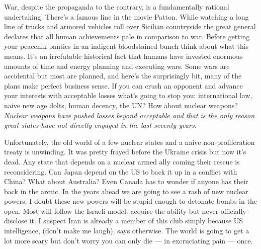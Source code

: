 War, despite the propaganda to the contrary, is a fundamentally rational
undertaking. There's a famous line in the movie Patton. While watching a
long line of trucks and armored vehicles roll over Sicilian countryside
the great general declares that all human achievements pale in
comparison to war. Before getting your peacenik panties in an indigent
bloodstained bunch think about what this means. It's an irrefutable
historical fact that humans have invested enormous amounts of time and
energy planning and executing wars. Some wars are accidental but most
are planned, and here's the surprisingly bit, many of the plans make
perfect business sense. If you can crush an opponent and advance your
interests with acceptable losses what's going to stop you:
international law, naive new age dolts, human decency, the UN? How
about nuclear weapons? \emph{Nuclear weapons have pushed losses beyond
acceptable and that is the only reason great states have not directly
engaged in the last seventy years.}

Unfortunately, the old world of a few nuclear states and a naive
non-proliferation treaty is unwinding. It was pretty frayed before the
Ukraine crisis but now it's dead. Any state that depends on a nuclear
armed ally coming their rescue is reconsidering. Can Japan depend on the
US to back it up in a conflict with China? What about Australia? Even
Canada has to wonder if anyone has their back in the arctic. In the
years ahead we are going to see a rash of new nuclear powers. I doubt
these new powers will be stupid enough to detonate bombs in the open.
Most will follow the Israeli model: acquire the ability but never
officially disclose it. I suspect Iran is already a member of this club
simply because US intelligence, (don't make me laugh), says otherwise.
The world is going to get a lot more scary but don't worry you can only
die --- in excruciating pain --- once.





%